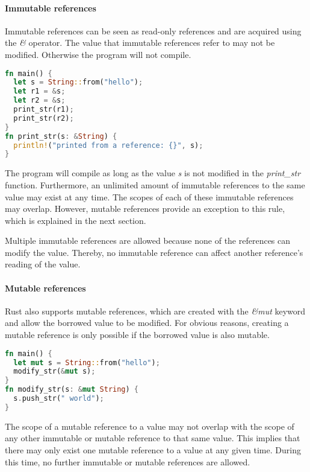 \documentclass[sigplan,11pt,nonacm]{acmart}
\begin{document}
\paragraph{Immutable references}

Immutable references can be seen as read-only references and are acquired using the \emph{\&} operator.
The value that immutable references refer to may not be modified.
Otherwise the program will not compile.

\begin{lstlisting}[language=Rust]
fn main() {
  let s = String::from("hello");
  let r1 = &s;
  let r2 = &s;
  print_str(r1);
  print_str(r2);
}
fn print_str(s: &String) {
  println!("printed from a reference: {}", s);
}
\end{lstlisting}

The program will compile as long as the value \emph{s} is not modified in the \emph{print\_str} function.
Furthermore, an unlimited amount of immutable references to the same value may exist at any time.
The scopes of each of these immutable references may overlap.
However, mutable references provide an exception to this rule, which is explained in the next section.

Multiple immutable references are allowed because none of the references can modify the value.
Thereby, no immutable reference can affect another reference's reading of the value.


\paragraph{Mutable references}

Rust also supports mutable references, which are created with the \emph{\&mut} keyword and allow the borrowed value to be modified.
For obvious reasons, creating a mutable reference is only possible if the borrowed value is also mutable.

\begin{lstlisting}[language=Rust]
fn main() {
  let mut s = String::from("hello");
  modify_str(&mut s);
}
fn modify_str(s: &mut String) {
  s.push_str(" world");
}
\end{lstlisting}

The scope of a mutable reference to a value may not overlap with the scope of any other immutable or mutable reference to that same value.
This implies that there may only exist one mutable reference to a value at any given time.
During this time, no further immutable or mutable references are allowed.
\end{document}
